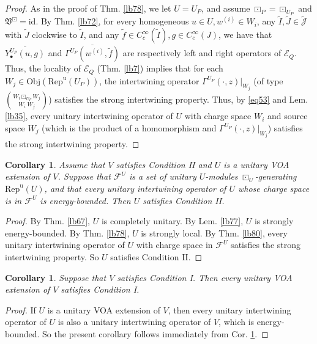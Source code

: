 \documentclass[11pt,b5paper,notitlepage]{article}
\theoremstyle{definition}
\theoremstyle{plain}
\newtheorem{co}[df]{Corollary}
\newcommand{\fk}{\mathfrak}
\newcommand{\mc}{\mathcal}
\newcommand{\wtd}{\widetilde}
\newcommand{\ovl}{\overline}
\newcommand{\id}{\mathrm{id}}
\newcommand{\uni}{\mathrm{u}}
\newcommand{\scr}{\mathscr}
\newcommand{\Jtd}{\widetilde{\mathcal J}}
\newcommand{\RepU}{\mathrm{Rep}^\uni(U)}
\newcommand{\blt}{\bullet}
\newcommand{\Obj}{\mathrm{Obj}}
\newcommand{\RepUP}{\mathrm{Rep}^{\mathrm u}(U_P)}
\numberwithin{equation}{section}
\begin{document}
\begin{proof}
As in the proof of Thm. \ref{lb78}, we let $U=U_P$, and assume $\boxdot_P=\boxdot_{U_P}$ and $\fk V^\boxdot=\id$. By Thm. \ref{lb72}, for every homogeneous $u\in U,w^{(i)}\in W_i$, any $\wtd I,\wtd J\in\Jtd$ with $\wtd J$ clockwise to $\wtd I$, and any $\wtd f\in C_c^\infty(\wtd I), g\in C_c^\infty(J)$, we have that $\ovl{Y^{U_P}_\blt(u,g)}$ and $\ovl{\Gamma^{U_P}(w^{(i)},\wtd f)}$ are respectively left and right operators of $\scr E_Q$. Thus, the locality of $\scr E_Q$ (Thm. \ref{lb7}) implies that for each $W_j\in\Obj(\RepUP)$, the intertwining operator $\Gamma^{U_P}(\cdot,z)|_{W_j}$ (of type $W_i\boxdot_{U_P}W_j\choose W_i~W_j$) satisfies the strong intertwining property. Thus, by \eqref{eq53} and Lem. \ref{lb35}, every unitary intertwining operator of $U$ with charge space $W_i$ and source space $W_j$ (which is the product of a homomorphism and $\Gamma^{U_P}(\cdot,z)|_{W_j}$) satisfies the strong intertwining property.
\end{proof}


\begin{co}\label{lb81}
Assume that $V$ satisfies Condition II and $U$ is a unitary VOA extension of $V$. Suppose that $\mc F^U$ is a set of unitary $U$-modules $\boxdot_U$-generating $\RepU$, and that every unitary intertwining operator of $U$ whose charge space is in $\mc F^U$ is energy-bounded. Then $U$ satisfies Condition II.
\end{co}


\begin{proof}
By Thm. \ref{lb67}, $U$ is completely unitary. By Lem. \ref{lb77}, $U$ is strongly energy-bounded. By Thm. \ref{lb78}, $U$ is strongly local. By Thm. \ref{lb80}, every unitary intertwining operator of $U$ with charge space in $\mc F^U$ satisfies the strong intertwining property. So $U$ satisfies Condition II.
\end{proof}


\begin{co}\label{lb90}
Suppose that $V$ satisfies Condition I. Then every unitary VOA extension of $V$ satisfies Condition I.
\end{co}

\begin{proof}
If $U$ is a unitary VOA extension of $V$, then every unitary intertwining operator of $U$ is also a unitary intertwining operator of $V$, which is energy-bounded. So the present corollary follows immediately from Cor. \ref{lb81}.
\end{proof}
\end{document}

